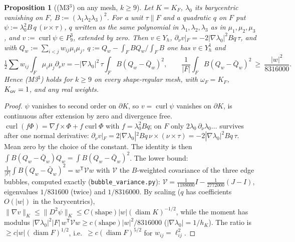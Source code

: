 \documentclass[11pt]{article}
\newtheorem{proposition}[theorem]{Proposition}
\theoremstyle{definition}
\newcommand{\norm}[1]{\lVert #1\rVert}
\newcommand{\curl}{\operatorname{curl}}
\DeclareMathOperator{\diam}{diam}
\begin{document}
\begin{proposition}[(M3$^3$) on any mesh, $k\ge9$]\label{A:bubble}
Let $K=K_F$, $\lambda_0$ its barycentric vanishing on $F$, $B:=(\lambda_1\lambda_2\lambda_3)^2$. For a unit $\tau\parallel F$ and a quadratic $q$ on $F$ put $\psi:=\lambda_0^2B\,q\,(\nu\times\tau)$, $q$ written as the same polynomial in $\lambda_1,\lambda_2,\lambda_3$ as in $\mu_1,\mu_2,\mu_3$, and $v:=\curl\psi\in P_9^3$, extended by zero. Then $v\in Y_h$, $\partial_\nu v|_F=-2|\nabla\lambda_0|^2Bq\,\tau$, and with $Q_w:=\sum_{i<j}w_{ij}\mu_i\mu_j$, $q:=Q_w-\int_FBQ_w/\int_FB$ one has $v\in Y_h^1$ and
\[
\tfrac12\sum w_{ij}\int_F\mu_i\mu_j\partial_\nu v=-|\nabla\lambda_0|^2\,\tau\int_FB(Q_w-\bar Q_w)^2,\qquad \frac1{|F|}\int_FB(Q_w-\bar Q_w)^2\ \ge\ \frac{|w|^2}{8316000}.
\]
Hence (M3$^3$) holds for $k\ge9$ on every shape-regular mesh, with $\omega_F=K_F$, $K_{\rm ov}=1$, and any real weights.
\end{proposition}
\begin{proof}
$\psi$ vanishes to second order on $\partial K$, so $v=\curl\psi$ vanishes on $\partial K$, is continuous after extension by zero and divergence free. $\curl(f\Phi)=\nabla f\times\Phi+f\curl\Phi$ with $f=\lambda_0^2Bq$; on $F$ only $2\lambda_0\,\partial_\nu\lambda_0\ldots$ survives after one normal derivative: $\partial_\nu v|_F=2|\nabla\lambda_0|^2Bq\,\nu\times(\nu\times\tau)=-2|\nabla\lambda_0|^2Bq\,\tau$. Mean zero by the choice of the constant. The identity is then $\int B(Q_w-\bar Q_w)Q_w=\int B(Q_w-\bar Q_w)^2$. The lower bound: $\frac1{|F|}\int B(Q_w-\bar Q_w)^2=w^{\mathsf T}\mathcal Vw$ with $\mathcal V$ the $B$-weighted covariance of the three edge bubbles, computed exactly (\texttt{bubble\_variance.py}): $\mathcal V=\frac1{1188000}I-\frac1{2772000}(J-I)$, eigenvalues $1/831600$ (twice) and $1/8316000$. By scaling ($q$ has coefficients $O(|w|)$ in the barycentrics), $\norm{\nabla v}_K\le\norm{D^2\psi}_K\le C(\text{shape})|w|(\diam K)^{-1/2}$, while the moment has modulus $|\nabla\lambda_0|^2|F|\,w^{\mathsf T}\mathcal Vw\ge c(\text{shape})|w|^2/8316000$ ($|\nabla\lambda_0|=1/h_K$). The ratio is $\ge c|w|(\diam F)^{1/2}$, i.e.\ $\ge c(\diam F)^{5/2}$ for $w_{ij}=\ell_{ij}^2$.
\end{proof}
\end{document}
